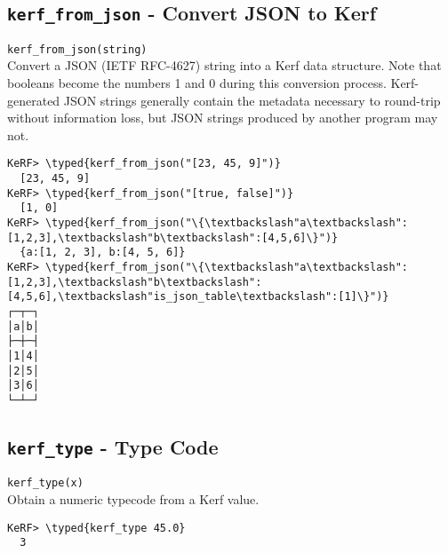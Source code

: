 \documentclass{article}
\newcommand{\typed}[1]{\textcolor{TealBlue}{#1}}
\newcommand{\primdefu}[3]{\subsection{\texttt{#1} - #2}\label{prim:#3}}
\begin{document}
\pagebreak
\primdefu{kerf\_from\_json}{Convert JSON to Kerf}{kerfFromJson}
\texttt{kerf\_from\_json(string)}\\

Convert a JSON (IETF RFC-4627) string into a Kerf data structure. Note that booleans become the numbers 1 and 0 during this conversion process. Kerf-generated JSON strings generally contain the metadata necessary to round-trip without information loss, but JSON strings produced by another program may not.
\begin{Verbatim}
KeRF> \typed{kerf_from_json("[23, 45, 9]")}
  [23, 45, 9]
KeRF> \typed{kerf_from_json("[true, false]")}
  [1, 0]
KeRF> \typed{kerf_from_json("\{\textbackslash"a\textbackslash":[1,2,3],\textbackslash"b\textbackslash":[4,5,6]\}")}
  {a:[1, 2, 3], b:[4, 5, 6]}
KeRF> \typed{kerf_from_json("\{\textbackslash"a\textbackslash":[1,2,3],\textbackslash"b\textbackslash":[4,5,6],\textbackslash"is_json_table\textbackslash":[1]\}")}
┌─┬─┐
│a│b│
├─┼─┤
│1│4│
│2│5│
│3│6│
└─┴─┘
\end{Verbatim}

\primdefu{kerf\_type}{Type Code}{kerfType}
\texttt{kerf\_type(x)}\\

Obtain a numeric typecode from a Kerf value.
\begin{Verbatim}
KeRF> \typed{kerf_type 45.0}
  3
\end{Verbatim}
\end{document}
